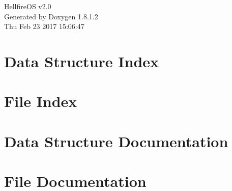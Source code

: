 \documentclass{book}
\begin{document}
\hypersetup{pageanchor=false,citecolor=blue}
\begin{titlepage}
\vspace*{7cm}
\begin{center}
{\Large Hellfire\-O\-S v2.0 }\\
\vspace*{1cm}
{\large Generated by Doxygen 1.8.1.2}\\
\vspace*{0.5cm}
{\small Thu Feb 23 2017 15:06:47}\\
\end{center}
\end{titlepage}
\clearemptydoublepage
{}
\tableofcontents
\clearemptydoublepage
{}
\hypersetup{pageanchor=true,citecolor=blue}
\chapter{Data Structure Index}

\chapter{File Index}

\chapter{Data Structure Documentation}













\chapter{File Documentation}
































\printindex
\end{document}
